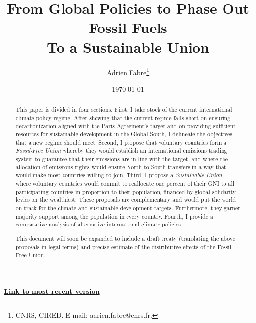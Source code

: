 \documentclass[12pt,english]{article}
\title{From Global Policies to Phase Out Fossil Fuels\\To a Sustainable Union}
\author{Adrien Fabre\footnote{CNRS, CIRED. E-mail: adrien.fabre@cnrs.fr.}}
\date{\today} %
\newcommand{\bo}[1]{\textbf{#1}}
\begin{document}
\sloppy
\maketitle

\begin{center}
{\bo{\href{https://github.com/bixiou/global_tax_attitudes/raw/main/paper/global_climate_policies.pdf}{Link to most recent version}}}
\end{center}


\begin{abstract}

This paper is divided in four sections. First, I take stock of the current international climate policy regime. After showing that the current regime falls short on ensuring decarbonization aligned with the Paris Agreement's target and on providing sufficient resources for sustainable development in the Global South, I delineate the objectives that a new regime should meet. Second, I propose that voluntary countries form a \textit{Fossil-Free Union} whereby they would establish an international emissions trading system to guarantee that their emissions are in line with the target, and where the allocation of emissions rights would ensure North-to-South transfers in a way that would make most countries willing to join. Third, I propose a \textit{Sustainable Union}, where voluntary countries would commit to reallocate one percent of their GNI to all participating countries in proportion to their population, financed by global solidarity levies on the wealthiest. These proposals are complementary and would put the world on track for the climate and sustainable development targets. Furthermore, they garner majority support among the population in every country. Fourth, I provide a comparative analysis of alternative international climate policies.

This document will soon be expanded to include a draft treaty (translating the above proposals in legal terms) and precise estimate of the distributive effects of the Fossil-Free Union.

\end{abstract}
\end{document}
